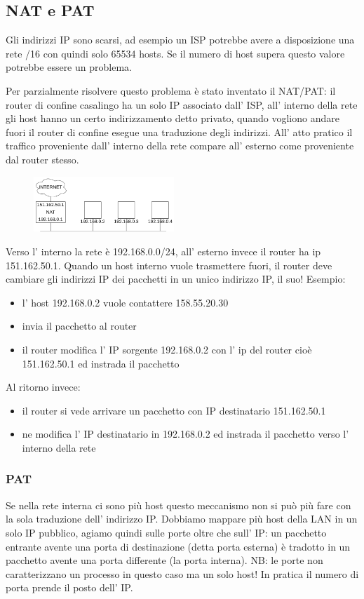 {{{{\subsection{NAT e PAT}
Gli indirizzi IP sono scarsi, ad esempio un ISP potrebbe avere a disposizione una rete /16 con quindi solo 65534 hosts.
Se il numero di host supera questo valore potrebbe essere un problema.

Per parzialmente risolvere questo problema è stato inventato il NAT/PAT:
il router di confine casalingo ha un solo IP associato dall' ISP, all' interno della rete gli host hanno un certo indirizzamento detto privato, quando vogliono andare fuori il router di confine esegue una traduzione degli indirizzi.
All' atto pratico il traffico proveniente dall' interno della rete compare all' esterno come proveniente dal router stesso.

\begin{figure}[H]
    \centering
    \includegraphics[width=200px]{images/4.1_Firewall/NAT.png}
\end{figure}
Verso l' interno la rete è 192.168.0.0/24, all' esterno invece il router ha ip 151.162.50.1.
Quando un host interno vuole trasmettere fuori, il router deve cambiare gli indirizzi IP dei pacchetti in un unico indirizzo IP, il suo!
Esempio:
\begin{itemize}
    \item l' host 192.168.0.2 vuole contattere 158.55.20.30
    \item invia il pacchetto al router
    \item il router modifica l' IP sorgente 192.168.0.2 con l' ip del router cioè 151.162.50.1 ed instrada il pacchetto
\end{itemize}
Al ritorno invece:
\begin{itemize}
    \item il router si vede arrivare un pacchetto con IP destinatario 151.162.50.1
    \item ne modifica l' IP destinatario in 192.168.0.2 ed instrada il pacchetto verso l' interno della rete
\end{itemize}

\subsubsection{PAT}
Se nella rete interna ci sono più host questo meccanismo non si può più fare con la sola traduzione dell' indirizzo IP.
Dobbiamo mappare più host della LAN in un solo IP pubblico, agiamo quindi sulle porte oltre che sull' IP: un pacchetto entrante avente una porta di destinazione (detta porta esterna) è tradotto in un pacchetto avente una porta differente (la porta interna).
NB: le porte non caratterizzano un processo in questo caso ma un solo host!
In pratica il numero di porta prende il posto dell' IP.

}}}}
